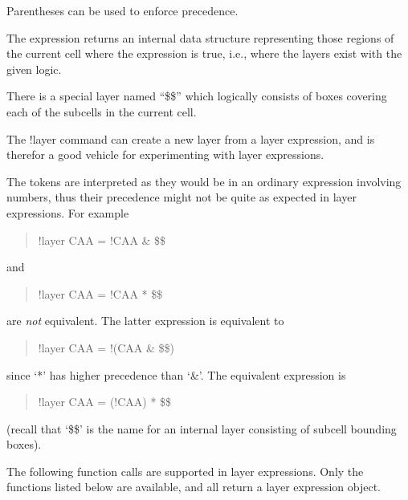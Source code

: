 Parentheses can be used to enforce precedence.

The expression returns an internal data structure representing those
regions of the current cell where the expression is true, i.e., where
the layers exist with the given logic.

There is a special layer named ``\$\$'' which logically consists of
boxes covering each of the subcells in the current cell.

The {\cb !layer} command can create a new layer from a layer
expression, and is therefor a good vehicle for experimenting with
layer expressions.

The tokens are interpreted as they would be in an ordinary expression
involving numbers, thus their precedence might not be quite as
expected in layer expressions.  For example
\begin{quote}
    {\vt !layer CAA = !CAA \& \$\$}
\end{quote}
and
\begin{quote}
    {\vt !layer CAA = !CAA * \$\$}
\end{quote}
are {\it not} equivalent.  The latter expression is equivalent to
\begin{quote}
    {\vt !layer CAA = !(CAA \& \$\$)}
\end{quote}
since `*' has higher precedence than `\&'.  The equivalent expression
is
\begin{quote}
    {\vt !layer CAA = (!CAA) * \$\$}
\end{quote}
(recall that `\$\$' is the name for an internal layer consisting of
subcell bounding boxes).

The following function calls are supported in layer expressions.  Only
the functions listed below are available, and all return a layer
expression object.

